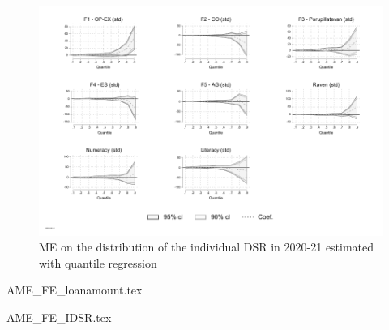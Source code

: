 \documentclass[a4paper, 11pt, onecolumn]{article}
\begin{document}
\begin{figure}[!h]
\raggedright
\includegraphics[width=\textwidth]{INPUT/qreg_DSR_indiv_2}
\caption{ME on the distribution of the individual DSR in 2020-21 estimated with quantile regression}
\label{fig:qreg_dsr}
\end{figure}

{AME_FE_loanamount.tex}

{AME_FE_IDSR.tex}



\clearpage
\newpage
\appendix
{}







\end{document}
